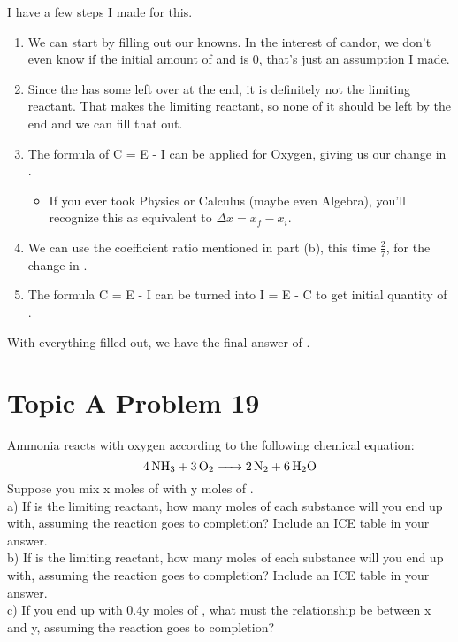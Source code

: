 \documentclass[10pt]{article}
\begin{document}
            I have a few steps I made for this.
            \begin{enumerate}
                \item   We can start by filling out our knowns. 
                In the interest of candor, we don't even know if the initial amount of  and  is 0, that's just an assumption I made.
                \item   Since the  has some left over at the end, it is definitely not the limiting reactant.
                That makes  the limiting reactant, so none of it should be left by the end and we can fill that out.
                \item   The formula of C = E - I can be applied for Oxygen, giving us our change in .
                \begin{itemize}
                    \item   If you ever took Physics or Calculus (maybe even Algebra), you'll recognize this as equivalent to $\Delta x = x_f - x_i$. 
                \end{itemize}
                \item   We can use the coefficient ratio mentioned in part (b), this time $\frac{2}{7}$, for the change in .
                \item   The formula C = E - I can be turned into I = E - C to get initial quantity of .
            \end{enumerate}

            With everything filled out, we have the final answer of .

    \pagebreak
    \section{Topic A Problem 19}
        Ammonia reacts with oxygen according to the following chemical equation:
        \begin{equation}
            \ce{4 NH3 + 3 O2 -> 2 N2 + 6 H2O}
        \end{equation}
        Suppose you mix x moles of  with y moles of .\\
        a) If  is the limiting reactant, how many moles of each substance will you end up with, assuming the reaction goes to completion? 
        Include an ICE table in your answer.\\
        b) If  is the limiting reactant, how many moles of each substance will you end up with, assuming the reaction goes to completion? 
        Include an ICE table in your answer.\\
        c) If you end up with 0.4y moles of , what must the relationship be between x and y, assuming the reaction goes to completion?
\end{document}
